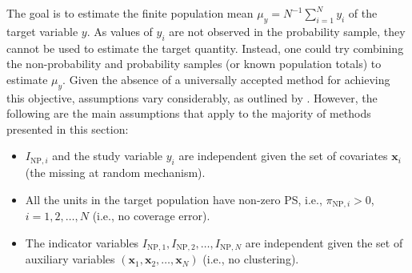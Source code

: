 \documentclass[nojss]{jss}
\begin{document}
\begin{table}[ht!]
    \centering
    \caption{Two-sample setting with no overlap between samples.}
    \label{tab-two-sources}
\end{table}

The goal is to estimate the finite population mean
\(\mu_{y} = N^{-1}\sum_{i=1}^{N} y_{i}\) of the target variable \(y\).
As values of \(y_{i}\) are not observed in the probability sample, they
cannot be used to estimate the target quantity. Instead, one could try
combining the non-probability and probability samples (or known
population totals) to estimate \(\mu_{y}\). Given the absence of a
universally accepted method for achieving this objective, assumptions
vary considerably, as outlined by \citet{wu2022statistical}. However,
the following are the main assumptions that apply to the majority of
methods presented in this section:

\begin{itemize}
\item[A1] $I_{\text{NP},i}$ and the study variable $y_{i}$ are independent given the set of covariates $\boldsymbol{x}_{i}$ (the missing at random mechanism).
\item[A2] All the units in the target population have non-zero PS, i.e., $\pi_{\text{NP},i}>0$, $i=1,2, \ldots, N$ (i.e., no coverage error).
\item[A3] The indicator variables $I_{\text{NP},1}, I_{\text{NP},2}, \ldots, I_{\text{NP},N}$ are independent given the set of auxiliary variables $\left(\boldsymbol{x}_1, \boldsymbol{x}_2, \ldots, \boldsymbol{x}_N\right)$ (i.e., no clustering).
\end{itemize}
\end{document}
